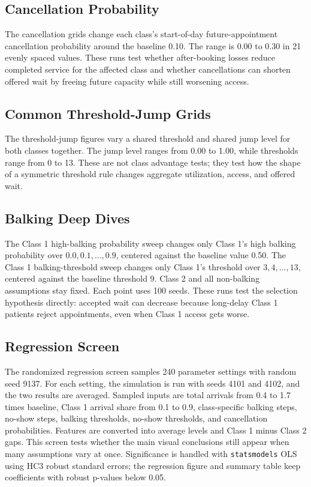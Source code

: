 \documentclass[11pt]{article}
\begin{document}
\subsection{Cancellation Probability}
The cancellation grids change each class's start-of-day future-appointment
cancellation probability around the baseline 0.10. The range is 0.00 to 0.30 in
21 evenly spaced values. These runs test whether after-booking losses reduce
completed service for the affected class and whether cancellations can shorten
offered wait by freeing future capacity while still worsening access.

\subsection{Common Threshold-Jump Grids}
The threshold-jump figures vary a shared threshold and shared jump level for both
classes together. The jump level ranges from 0.00 to 1.00, while thresholds
range from 0 to 13. These are not class advantage tests; they test how the shape
of a symmetric threshold rule changes aggregate utilization, access, and offered
wait.

\subsection{Balking Deep Dives}
The Class 1 high-balking probability sweep changes only Class 1's high balking
probability over $0.0, 0.1, \ldots, 0.9$, centered against the baseline value
0.50. The Class 1 balking-threshold sweep changes only Class 1's threshold over
$3, 4, \ldots, 13$, centered against the baseline threshold 9. Class 2 and all
non-balking assumptions stay fixed. Each point uses 100 seeds. These runs test
the selection hypothesis directly: accepted wait can decrease because long-delay
Class 1 patients reject appointments, even when Class 1 access gets worse.

\subsection{Regression Screen}
The randomized regression screen samples 240 parameter settings with random seed
9137. For each setting, the simulation is run with seeds 4101 and 4102, and the
two results are averaged. Sampled inputs are total arrivals from 0.4 to 1.7
times baseline, Class 1 arrival share from 0.1 to 0.9, class-specific balking
steps, no-show steps, balking thresholds, no-show thresholds, and cancellation
probabilities. Features are converted into average levels and Class 1 minus
Class 2 gaps. This screen tests whether the main visual conclusions still appear
when many assumptions vary at once. Significance is handled with
\texttt{statsmodels} OLS using HC3 robust standard errors; the regression figure
and summary table keep coefficients with robust p-values below 0.05.
\end{document}
